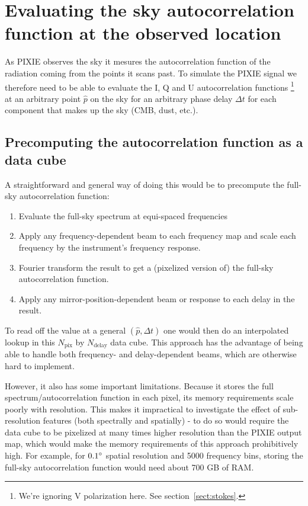\documentclass{article}
\begin{document}

\section{Evaluating the sky autocorrelation function at the observed location}
As PIXIE observes the sky it mesures the autocorrelation function of the
radiation coming from the points it scans past. To simulate the PIXIE signal
we therefore need to be able to evaluate the I, Q and U autocorrelation
functions
\footnote{We're ignoring V polarization here. See section~\ref{sect:stokes}.}
at an arbitrary point $\hat p$ on the sky for an arbitrary phase
delay $\Delta t$ for each component that makes up the sky (CMB, dust, etc.).

\subsection{Precomputing the autocorrelation function as a data cube}
\label{sect:autocorr-problems}
A straightforward and general way of doing this would be to precompute the
full-sky autocorrelation function:
\begin{enumerate}
	\item Evaluate the full-sky spectrum at equi-spaced
frequencies
	\item Apply any frequency-dependent beam to each frequency map and
scale each frequency by the instrument's frequency response.
	\item Fourier transform the result to get a (pixelized version of)
		the full-sky autocorrelation function.
	\item Apply any mirror-position-dependent beam or response to
		each delay in the result.
\end{enumerate}
To read off the value at a general $(\hat p, \Delta t)$ one would then do
an interpolated lookup in this $N_\textrm{pix}$ by $N_\textrm{delay}$ data
cube. This approach has the advantage of being able to handle both frequency-
and delay-dependent beams, which are otherwise hard to implement.

However, it also has some important limitations. Because it stores the full
spectrum/autocorrelation function in each pixel, its memory requirements
scale poorly with resolution. This makes it impractical to investigate the effect
of sub-resolution features (both spectrally and spatially) - to do so would
require the data cube to be pixelized at many times higher resolution
than the PIXIE output map, which would make the memory requirements of this approach
prohibitively high. For example,
for $0.1\degree$ spatial resolution and 5000 frequency bins, storing the full-sky
autocorrelation function would need about 700 GB of RAM.
\end{document}
